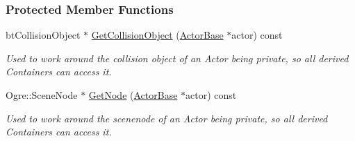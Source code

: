 \subsubsection*{Protected Member Functions}
\begin{DoxyCompactItemize}
\item 
\hypertarget{classphys_1_1ActorContainerBase_a3f3d84f7775d2e8597290e214fedd5f9}{
btCollisionObject $\ast$ \hyperlink{classphys_1_1ActorContainerBase_a3f3d84f7775d2e8597290e214fedd5f9}{GetCollisionObject} (\hyperlink{classphys_1_1ActorBase}{ActorBase} $\ast$actor) const }
\label{classphys_1_1ActorContainerBase_a3f3d84f7775d2e8597290e214fedd5f9}

\begin{DoxyCompactList}\small\item\em Used to work around the collision object of an Actor being private, so all derived Containers can access it. \item\end{DoxyCompactList}\item 
\hypertarget{classphys_1_1ActorContainerBase_a44adf1174e624d9fa1408c9885f9ea12}{
Ogre::SceneNode $\ast$ \hyperlink{classphys_1_1ActorContainerBase_a44adf1174e624d9fa1408c9885f9ea12}{GetNode} (\hyperlink{classphys_1_1ActorBase}{ActorBase} $\ast$actor) const }
\label{classphys_1_1ActorContainerBase_a44adf1174e624d9fa1408c9885f9ea12}

\begin{DoxyCompactList}\small\item\em Used to work around the scenenode of an Actor being private, so all derived Containers can access it. \item\end{DoxyCompactList}\end{DoxyCompactItemize}


